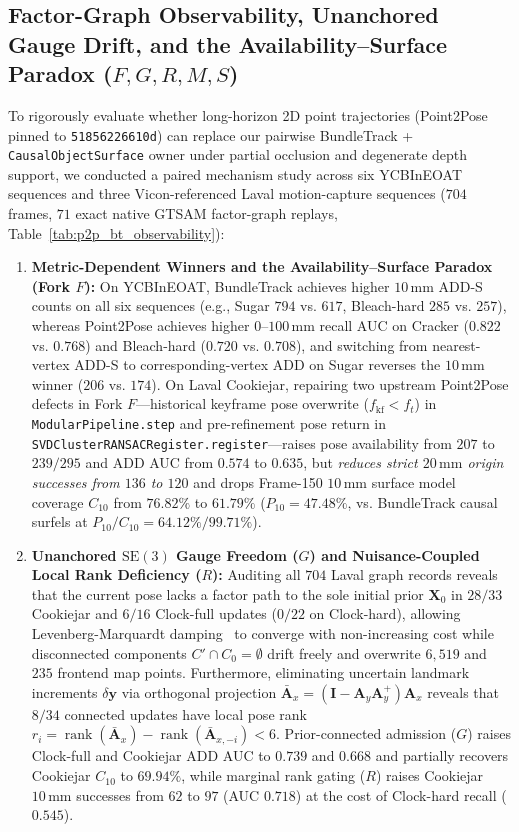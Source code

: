 \documentclass[10pt,journal]{IEEEtran}
\begin{document}
\subsection{Factor-Graph Observability, Unanchored Gauge Drift, and the Availability--Surface Paradox ($F, G, R, M, S$)}
\label{sec:observability_audit}
To rigorously evaluate whether long-horizon 2D point trajectories (Point2Pose~\cite{point2pose2026} pinned to \texttt{51856226610d}) can replace our pairwise BundleTrack + \texttt{CausalObjectSurface} owner under partial occlusion and degenerate depth support, we conducted a paired mechanism study across six YCBInEOAT sequences and three Vicon-referenced Laval motion-capture sequences ($704$ frames, $71$ exact native GTSAM factor-graph replays, Table~\ref{tab:p2p_bt_observability}):
\begin{enumerate}
    \item \textbf{Metric-Dependent Winners and the Availability--Surface Paradox (Fork $F$):} On YCBInEOAT, BundleTrack achieves higher $10\,\mathrm{mm}$ ADD-S counts on all six sequences (e.g., Sugar $794$ vs. $617$, Bleach-hard $285$ vs. $257$), whereas Point2Pose achieves higher $0$--$100\,\mathrm{mm}$ recall AUC on Cracker ($0.822$ vs. $0.768$) and Bleach-hard ($0.720$ vs. $0.708$), and switching from nearest-vertex ADD-S to corresponding-vertex ADD on Sugar reverses the $10\,\mathrm{mm}$ winner ($206$ vs. $174$). On Laval Cookiejar, repairing two upstream Point2Pose defects in Fork $F$---historical keyframe pose overwrite ($f_{\mathrm{kf}} < f_t$) in \texttt{ModularPipeline.step} and pre-refinement pose return in \texttt{SVDClusterRANSACRegister.register}---raises pose availability from $207$ to $239/295$ and ADD AUC from $0.574$ to $0.635$, but \emph{reduces strict $20\,\mathrm{mm}$ origin successes from $136$ to $120$} and drops Frame-150 $10\,\mathrm{mm}$ surface model coverage $C_{10}$ from $76.82\%$ to $61.79\%$ ($P_{10} = 47.48\%$, vs. BundleTrack causal surfels at $P_{10}/C_{10} = 64.12\% / 99.71\%$).
    \item \textbf{Unanchored $\mathrm{SE}(3)$ Gauge Freedom ($G$) and Nuisance-Coupled Local Rank Deficiency ($R$):} Auditing all $704$ Laval graph records reveals that the current pose lacks a factor path to the sole initial prior $\mathbf{X}_0$ in $28/33$ Cookiejar and $6/16$ Clock-full updates ($0/22$ on Clock-hard), allowing Levenberg-Marquardt damping~\cite{zhang2016degeneracy,xicp} to converge with non-increasing cost while disconnected components $C' \cap C_0 = \emptyset$ drift freely and overwrite $6{,}519$ and $235$ frontend map points. Furthermore, eliminating uncertain landmark increments $\delta\mathbf{y}$ via orthogonal projection $\bar{\mathbf{A}}_x = (\mathbf{I} - \mathbf{A}_y \mathbf{A}_y^+) \mathbf{A}_x$ reveals that $8/34$ connected updates have local pose rank $r_i = \operatorname{rank}(\bar{\mathbf{A}}_x) - \operatorname{rank}(\bar{\mathbf{A}}_{x,-i}) < 6$. Prior-connected admission ($G$) raises Clock-full and Cookiejar ADD AUC to $0.739$ and $0.668$ and partially recovers Cookiejar $C_{10}$ to $69.94\%$, while marginal rank gating ($R$) raises Cookiejar $10\,\mathrm{mm}$ successes from $62$ to $97$ (AUC $0.718$) at the cost of Clock-hard recall ($0.545$).

\end{enumerate}
\end{document}
